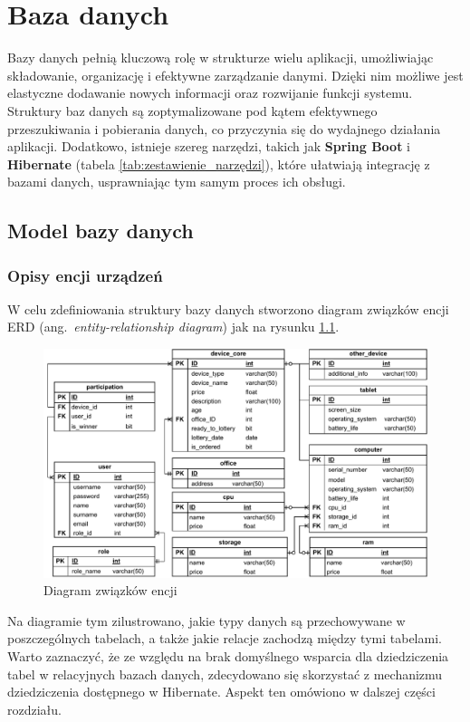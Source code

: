 \chapter{Baza danych}
Bazy danych pełnią kluczową rolę w strukturze wielu aplikacji, umożliwiając składowanie, organizację i efektywne zarządzanie danymi. Dzięki nim możliwe jest elastyczne dodawanie nowych informacji oraz rozwijanie funkcji systemu. Struktury baz danych są zoptymalizowane pod kątem efektywnego przeszukiwania i pobierania danych, co przyczynia się do wydajnego działania aplikacji. Dodatkowo, istnieje szereg narzędzi, takich jak \textbf{Spring Boot} i \textbf{Hibernate} (tabela \ref{tab:zestawienie_narzędzi}), które ułatwiają integrację z bazami danych, usprawniając tym samym proces ich obsługi.

\section{Model bazy danych}
\subsection{Opisy encji urządzeń}
W celu zdefiniowania struktury bazy danych stworzono diagram związków encji ERD (ang.~\emph{entity-relationship diagram}) jak na rysunku \ref{ErDiagram:label}.
\begin{figure}[b]
    \includegraphics[width=\linewidth]{rys04/ER_Diagram.pdf}
    \caption{Diagram związków encji}
    \label{ErDiagram:label}
\end{figure}
Na diagramie tym zilustrowano, jakie typy danych są przechowywane w poszczególnych tabelach, a także jakie relacje zachodzą między tymi tabelami. Warto zaznaczyć, że ze względu na brak domyślnego wsparcia dla dziedziczenia tabel w relacyjnych bazach danych, zdecydowano się skorzystać z mechanizmu dziedziczenia dostępnego w Hibernate. Aspekt ten omówiono w dalszej części rozdziału.

